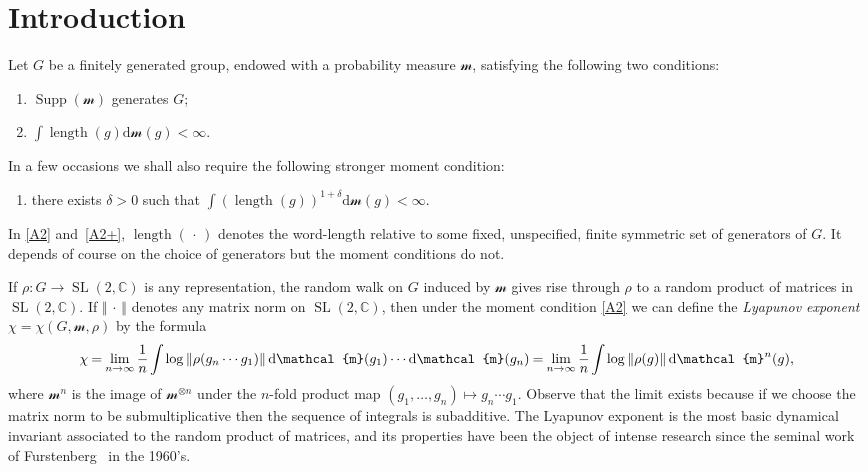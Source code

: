\documentclass[11pt]{article}
\theoremstyle{definition}
\numberwithin{equation}{section}
\numberwithin{figure}{section}
\numberwithin{table}{section}
\DeclareMathOperator{\supp}{Supp}
\DeclareMathOperator{\length}{length}
\DeclareMathOperator{\SL}{SL}
\newcommand{\sm}{\mathcal{m}}
\newcommand{\norm}[1]{\left\Vert#1\right\Vert}
\newcommand{\unsur}[1]{\frac{1}{#1}}
\newcommand{\SLC}{\SL(2,\mathbb C)}
\newcommand*{\dd}{\mathrm{d}}
\newcommand*{\dsm}{\dd \sm}
\newcommand*{\mk}{\mkern -1mu}
\begin{document}
\section*{Introduction}

Let $G$ be a finitely generated group, endowed with a probability measure $\sm$, satisfying the following two conditions:
\begin{enumerate}\renewcommand{\theenumi}{A\arabic{enumi}}
\item \label{A1} $\supp(\sm)$ generates $G$;
\item \label{A2} $ \int \length(g) \dsm(g)<\infty$.
\end{enumerate}
In a few occasions we shall also require the following stronger moment condition:
\begin{enumerate}\renewcommand{\theenumi}{A\arabic{enumi}${}^+$}\setcounter{enumi}{1}
\item \label{A2+} there exists $\delta >0$ such that $ \int (\length(g))^{1+\delta} \dsm(g)<\infty$.
\end{enumerate}
In \eqref{A2} and~\eqref{A2+}, $\length({\,\cdot\,})$ denotes the word-length relative to some fixed, unspecified, finite symmetric set of generators of $G$. It depends of course on the choice of generators but the moment conditions do not.


If $\rho:G \to \SLC$ is any representation, the random walk on $G$ induced by $\sm$ gives rise through $\rho$ to a random product of matrices in $\SLC$. If $\norm{{\,\cdot\,}}$ denotes any matrix norm on $\SLC$, then under the moment condition \eqref{A2} we can define the \emph{Lyapunov exponent} $\chi = \chi(G, \sm, \rho)$ by the formula
\begin{equation}
\label{def:lyapunov exponent intro}
\!\chi \mk=\mk \lim_{n\to\infty} \unsur{n} \mk\int\mk \log\norm{\rho(g_n\cdots g_1)} \dsm(g_1) \cdots \dsm(g_n) \mk=\mk \lim_{n\to\infty} \unsur{n} \mk\int\mk \log\norm{\rho(g)} \dsm^n(g),
\end{equation}
where $\sm^n$ is the image of $\sm^{\otimes n}$ under the $n$-fold product map $(g_1, \ldots, g_n)\mapsto g_n\cdots g_1$. Observe that the limit exists because if we choose the matrix norm to be submultiplicative then the sequence of integrals is subadditive. The Lyapunov exponent is the most basic dynamical invariant associated to the random product of matrices, and its properties have been the object of intense research since the seminal work of Furstenberg~\cite{furstenberg} in the 1960's.
\end{document}
